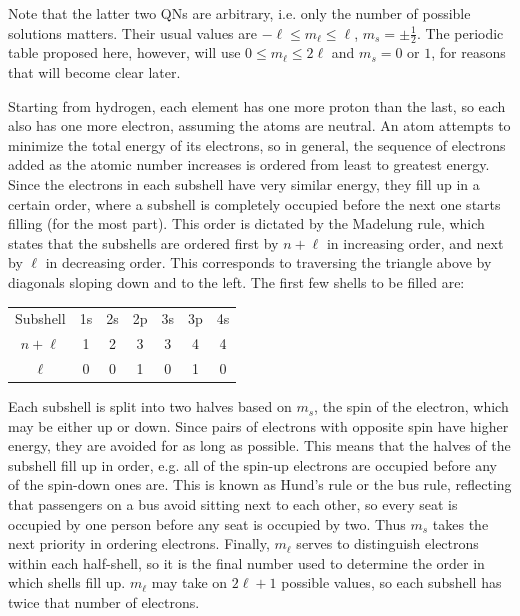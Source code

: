 \documentclass{article}
\begin{document}
Note that the latter two QNs are arbitrary,
i.e. only the number of possible solutions matters.
Their usual values are
$-\ell \leq m_\ell \leq \ell$,
$m_s = \pm \frac{1}{2}$.
The periodic table proposed here, however, will use
$0 \leq m_\ell \leq 2\ell$ and $m_s = 0$ or $1$,
for reasons that will become clear later.

Starting from hydrogen,
each element has one more proton than the last,
so each also has one more electron, assuming the atoms are neutral.
An atom attempts to minimize the total energy of its electrons,
so in general, the sequence of electrons added as the atomic number increases
is ordered from least to greatest energy.
Since the electrons in each subshell have very similar energy,
they fill up in a certain order,
where a subshell is completely occupied before the next one starts filling
(for the most part).
This order is dictated by the Madelung rule,
which states that the subshells are ordered first by $n+\ell$ in increasing order,
and next by $\ell$ in decreasing order.
This corresponds to traversing the triangle above
by diagonals sloping down and to the left.
The first few shells to be filled are:

\begin{tabular}{|c|c c c c c c|}
  \hline
  Subshell & 1s & 2s & 2p & 3s & 3p & 4s \\ 
  $n+\ell$ & 1 & 2 & 3 & 3 & 4 & 4 \\ 
  $\ell$ & 0 & 0 & 1 & 0 & 1 & 0 \\
  \hline
\end{tabular}

Each subshell is split into two halves based on $m_s$,
the spin of the electron,
which may be either up or down.
Since pairs of electrons with opposite spin have higher energy,
they are avoided for as long as possible.
This means that the halves of the subshell fill up in order,
e.g. all of the spin-up electrons are occupied before any of the spin-down ones are.
This is known as Hund's rule or the bus rule,
reflecting that passengers on a bus avoid sitting next to each other,
so every seat is occupied by one person before any seat is occupied by two.
Thus $m_s$ takes the next priority in ordering electrons.
Finally, $m_\ell$ serves to distinguish electrons within each half-shell,
so it is the final number used to determine the order in which shells fill up.
$m_\ell$ may take on $2\ell+1$ possible values,
so each subshell has twice that number of electrons.
\end{document}
